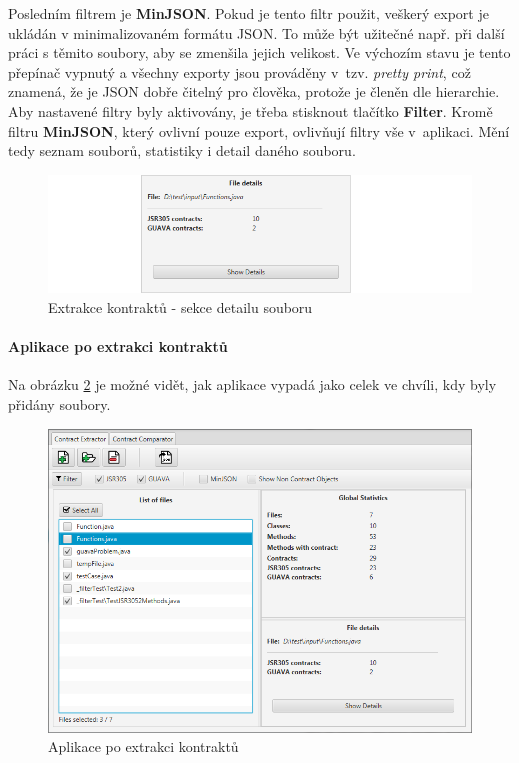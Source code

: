			Posledním filtrem je \textbf{MinJSON}. Pokud je tento filtr použit, veškerý export je ukládán v minimalizovaném formátu JSON. To může být užitečné např. při další práci s těmito soubory, aby se zmenšila jejich velikost. Ve výchozím stavu je tento přepínač vypnutý a všechny exporty jsou prováděny v~tzv. \emph{pretty print}, což znamená, že je JSON dobře čitelný pro člověka, protože je členěn dle hierarchie.\\
			
			Aby nastavené filtry byly aktivovány, je třeba stisknout tlačítko \textbf{Filter}. Kromě filtru \textbf{MinJSON}, který ovlivní pouze export, ovlivňují filtry vše v~aplikaci. Mění tedy seznam souborů, statistiky i detail daného souboru.
			
			\begin{figure}[!htb]
					\centering
					\includegraphics[width=1\textwidth]{img/guide04.png}
					\caption[guide04]{Extrakce kontraktů - sekce detailu souboru}
					\label{guide04}
				\endminipage\hfill
			\end{figure}
			
				\paragraph{Aplikace po extrakci kontraktů}
					Na obrázku \ref{guide09} je možné vidět, jak aplikace vypadá jako celek ve chvíli, kdy byly přidány soubory.
					
			\begin{figure}[!htb]
					\centering
					\includegraphics[width=1\textwidth]{img/guide09.png}
					\caption[guide09]{Aplikace po extrakci kontraktů}
					\label{guide09}
				\endminipage\hfill
			\end{figure}						
			
